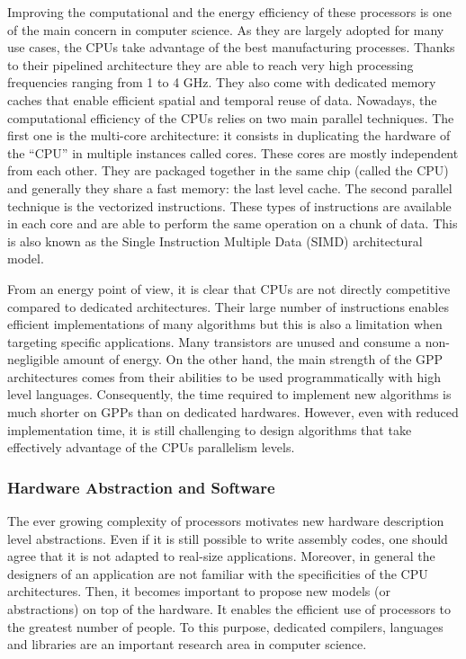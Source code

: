 Improving the computational and the energy efficiency of these processors is one
of the main concern in computer science. As they are largely adopted for many
use cases, the CPUs take advantage of the best manufacturing processes. Thanks
to their pipelined architecture they are able to reach very high processing
frequencies ranging from 1 to 4 GHz. They also come with dedicated memory caches
that enable efficient spatial and temporal reuse of data.
Nowadays, the computational efficiency of the CPUs relies on two main parallel
techniques. The first one is the multi-core architecture: it consists in
duplicating the hardware of the ``CPU'' in multiple instances called cores.
These cores are mostly independent from each other. They are packaged together
in the same chip (called the CPU) and generally they share a fast memory: the
last level cache. The second parallel technique is the vectorized instructions.
These types of instructions are available in each core and are able to perform
the same operation on a chunk of data. This is also known as the Single
Instruction Multiple Data (SIMD) architectural model.

From an energy point of view, it is clear that CPUs are not directly competitive
compared to dedicated architectures. Their large number of instructions enables
efficient implementations of many algorithms but this is also a limitation when
targeting specific applications. Many transistors are unused and consume a
non-negligible amount of energy. On the other hand, the main strength of the GPP
architectures comes from their abilities to be used programmatically with high
level languages. Consequently, the time required to implement new algorithms is
much shorter on GPPs than on dedicated hardwares. However, even with reduced
implementation time, it is still challenging to design algorithms that take
effectively advantage of the CPUs parallelism levels.

\subsubsection*{Hardware Abstraction and Software}

The ever growing complexity of processors motivates new hardware description
level abstractions. Even if it is still possible to write assembly codes, one
should agree that it is not adapted to real-size applications. Moreover, in
general the designers of an application are not familiar with the specificities
of the CPU architectures. Then, it becomes important to propose new models (or
abstractions) on top of the hardware. It enables the efficient use of processors
to the greatest number of people. To this purpose, dedicated compilers,
languages and libraries are an important research area in computer science.

